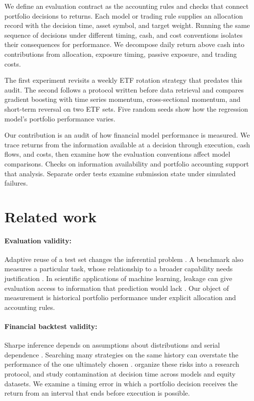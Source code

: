 \documentclass{article}
\begin{document}
We define an evaluation contract as the accounting rules and checks that connect portfolio decisions to returns. Each model or trading rule supplies an allocation record with the decision time, asset symbol, and target weight. Running the same sequence of decisions under different timing, cash, and cost conventions isolates their consequences for performance. We decompose daily return above cash into contributions from allocation, exposure timing, passive exposure, and trading costs.

The first experiment revisits a weekly ETF rotation strategy that predates this audit. The second follows a protocol written before data retrieval and compares gradient boosting with time series momentum, cross-sectional momentum, and short-term reversal on two ETF sets. Five random seeds show how the regression model's portfolio performance varies.

Our contribution is an audit of how financial model performance is measured. We trace returns from the information available at a decision through execution, cash flows, and costs, then examine how the evaluation conventions affect model comparisons. Checks on information availability and portfolio accounting support that analysis. Separate order tests examine submission state under simulated failures.

\section{Related work}

\paragraph{Evaluation validity:}
Adaptive reuse of a test set changes the inferential problem
\citep{dwork2015reusable}. A benchmark also measures a particular task, whose relationship to a broader capability needs justification \citep{raji2021benchmark}. In scientific applications of machine learning, leakage can give evaluation access to information that prediction would lack \citep{kapoor2023leakage}. Our object of measurement is historical portfolio performance under explicit allocation and accounting rules.

\paragraph{Financial backtest validity:}
Sharpe inference depends on assumptions about distributions and serial dependence
\citep{lo2002statistics}. Searching many strategies on the same history can overstate the performance of the one ultimately chosen
\citep{white2000reality,bailey2014deflated,bailey2017pbo,harvey2016crosssection}.
\citet{arnott2019protocol} organize these risks into a research protocol, and
\citet{zhang2026alpha} study contamination at decision time across models and equity datasets. We examine a timing error in which a portfolio decision receives the return from an interval that ends before execution is possible.
\end{document}
